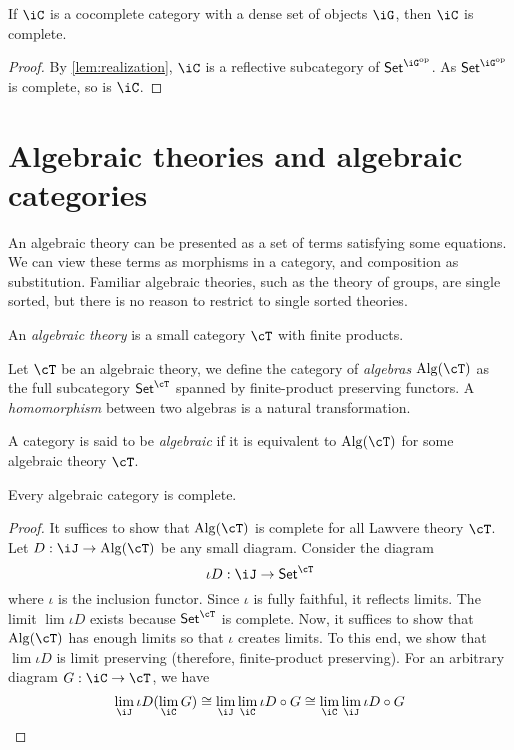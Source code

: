 \documentclass{zett}
\begin{document}
\begin{cor}
  If $\iC$ is a cocomplete category with a dense set of objects $\iG$, then $\iC$ is complete.
\end{cor}
\begin{proof}
  By \cref{lem:realization}, $\iC$ is a reflective subcategory of $\CSet^{\iG\op}$.
  As $\CSet^{\iG\op}$ is complete, so is $\iC$.
\end{proof}

\section{Algebraic theories and algebraic categories}
\label{sec:algebraic-theories-and-algebraic-categories}

An algebraic theory can be presented as a set of terms satisfying some equations.
We can view these terms as morphisms in a category, and composition as substitution.
Familiar algebraic theories, such as the theory of groups, are single sorted, but there is no reason to restrict to single sorted theories.

\begin{defn}
  An \emph{algebraic theory} is a small category $\cT$ with finite products.
\end{defn}

\begin{defn}
  Let $\cT$ be an algebraic theory, we define the category of \emph{algebras} $\Alg(\cT)$ as the full subcategory $\CSet^{\cT}$ spanned by finite-product preserving functors.
  A \emph{homomorphism} between two algebras is a natural transformation.
\end{defn}

\begin{defn}
  A category is said to be \emph{algebraic} if it is equivalent to $\Alg(\cT)$ for some algebraic theory $\cT$.
\end{defn}

\begin{thm}
  Every algebraic category is complete.
\end{thm}
\begin{proof}
  It suffices to show that $\Alg(\cT)$ is complete for all Lawvere theory $\cT$.
  Let $D : \iJ \to \Alg(\cT)$ be any small diagram.
  Consider the diagram
  \[
    \iota D : \iJ \to \CSet^{\cT}
  \]
  where $\iota$ is the inclusion functor.
  Since $\iota$ is fully faithful, it reflects limits.
  The limit $\lim \iota D$ exists because $\CSet^{\cT}$ is complete.
  Now, it suffices to show that $\Alg(\cT)$ has enough limits so that $\iota$ creates limits.
  To this end, we show that $\lim \iota D$ is limit preserving (therefore, finite-product preserving).
  For an arbitrary diagram $G : \iC \to \cT$, we have
  \[
    \lim_{\iJ} \iota D(\lim_{\iC}G) \iso \lim_{\iJ}\lim_{\iC}\iota D \circ G \iso \lim_{\iC}\lim_{\iJ}\iota D \circ G
  \]
\end{proof}
\end{document}
